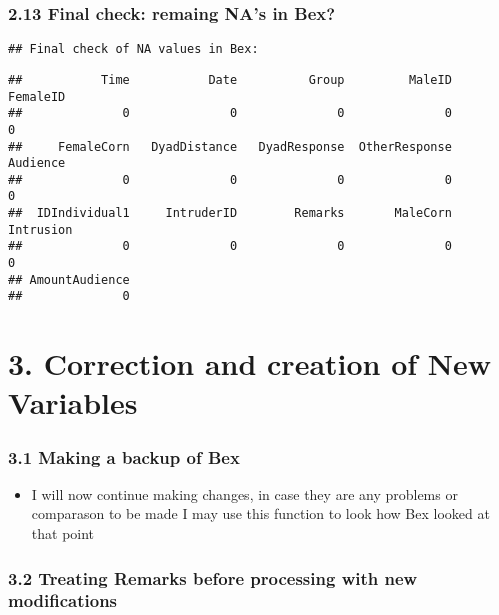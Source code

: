 \documentclass[
]{article}
\providecommand{\tightlist}{%
  \setlength{\itemsep}{0pt}\setlength{\parskip}{0pt}}
\begin{document}
\hypertarget{final-check-remaing-nas-in-bex}{%
\subsubsection{2.13 Final check: remaing NA's in
Bex?}\label{final-check-remaing-nas-in-bex}}

\begin{verbatim}
## Final check of NA values in Bex:
\end{verbatim}

\begin{verbatim}
##           Time           Date          Group         MaleID       FemaleID 
##              0              0              0              0              0 
##     FemaleCorn   DyadDistance   DyadResponse  OtherResponse       Audience 
##              0              0              0              0              0 
##  IDIndividual1     IntruderID        Remarks       MaleCorn      Intrusion 
##              0              0              0              0              0 
## AmountAudience 
##              0
\end{verbatim}

\hypertarget{correction-and-creation-of-new-variables}{%
\section{3. Correction and creation of New
Variables}\label{correction-and-creation-of-new-variables}}

\hypertarget{making-a-backup-of-bex}{%
\subsubsection{3.1 Making a backup of
Bex}\label{making-a-backup-of-bex}}

\begin{itemize}
\tightlist
\item
  I will now continue making changes, in case they are any problems or
  comparason to be made I may use this function to look how Bex looked
  at that point
\end{itemize}

\hypertarget{treating-remarks-before-processing-with-new-modifications}{%
\subsubsection{3.2 Treating Remarks before processing with new
modifications}\label{treating-remarks-before-processing-with-new-modifications}}
\end{document}
